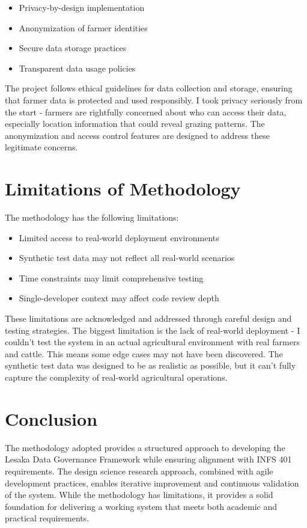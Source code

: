 \begin{itemize}
    \item Privacy-by-design implementation
    \item Anonymization of farmer identities
    \item Secure data storage practices
    \item Transparent data usage policies
\end{itemize}

The project follows ethical guidelines for data collection and storage, ensuring that farmer data is protected and used responsibly. I took privacy seriously from the start - farmers are rightfully concerned about who can access their data, especially location information that could reveal grazing patterns. The anonymization and access control features are designed to address these legitimate concerns.

\section{Limitations of Methodology}

The methodology has the following limitations:

\begin{itemize}
    \item Limited access to real-world deployment environments
    \item Synthetic test data may not reflect all real-world scenarios
    \item Time constraints may limit comprehensive testing
    \item Single-developer context may affect code review depth
\end{itemize}

These limitations are acknowledged and addressed through careful design and testing strategies. The biggest limitation is the lack of real-world deployment - I couldn't test the system in an actual agricultural environment with real farmers and cattle. This means some edge cases may not have been discovered. The synthetic test data was designed to be as realistic as possible, but it can't fully capture the complexity of real-world agricultural operations.

\section{Conclusion}

The methodology adopted provides a structured approach to developing the Lesaka Data Governance Framework while ensuring alignment with INFS 401 requirements. The design science research approach, combined with agile development practices, enables iterative improvement and continuous validation of the system. While the methodology has limitations, it provides a solid foundation for delivering a working system that meets both academic and practical requirements.
